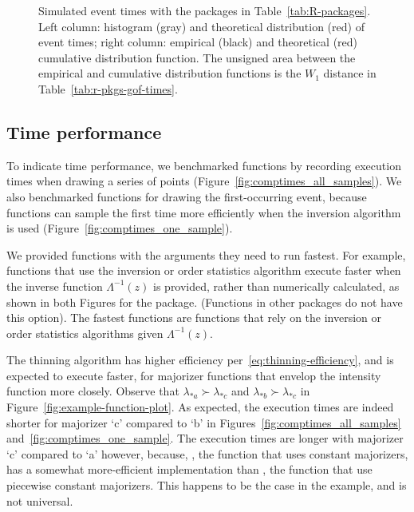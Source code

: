 \documentclass[article,nojss]{jss}\usepackage[]{graphicx}\usepackage[]{xcolor}
\newenvironment{knitrout}{}{} %
\newcommand{\fct}[1]{\code{#1()}}
\begin{document}
\begin{knitrout}
\begin{figure}
{}

\caption{Simulated event times with the  packages in Table~\ref{tab:R-packages}. Left column: histogram (gray) and theoretical distribution (red) of event times; right column: empirical (black) and theoretical (red) cumulative distribution function. The unsigned area between the empirical and cumulative distribution functions is the $W_1$ distance in Table~\ref{tab:r-pkgs-gof-times}.}\label{fig:epdf-r-pkgs-times}
\end{figure}

\end{knitrout}


\subsection{Time performance}\label{sec:example-time-performance}

To indicate time performance, we benchmarked functions by recording execution times when drawing a series of points (Figure~\ref{fig:comptimes_all_samples}). We also benchmarked functions for drawing the first-occurring event, because  functions can sample the first time more efficiently when the inversion algorithm is used (Figure~\ref{fig:comptimes_one_sample}).

We provided functions with the arguments they need to run fastest. For example, functions that use the inversion or order statistics algorithm execute faster when the inverse function $\Lambda^{-1}(z)$ is provided, rather than numerically calculated, as shown in both Figures for the  package. (Functions in other packages do not have this option). The fastest functions are  functions that rely on the inversion or order statistics algorithms given $\Lambda^{-1}(z)$.

The thinning algorithm has higher efficiency per~\eqref{eq:thinning-efficiency}, and is expected to execute faster, for majorizer functions that envelop the intensity function more closely. Observe that $\lambda_{*a} \succ \lambda_{*c}$ and $\lambda_{*b} \succ \lambda_{*c}$ in Figure~\ref{fig:example-function-plot}. As expected, the execution times are indeed shorter for majorizer `c' compared to `b' in Figures~\ref{fig:comptimes_all_samples} and~\ref{fig:comptimes_one_sample}. The execution times are longer with majorizer `c' compared to `a' however, because, \fct{nhppp\_t\_intensity}, the function that uses constant majorizers, has a somewhat more-efficient implementation than \fct{nhppp\_t\_intensity\_piecewise}, the function that use piecewise constant majorizers. This happens to be the case in the example, and is not universal.
\end{document}

